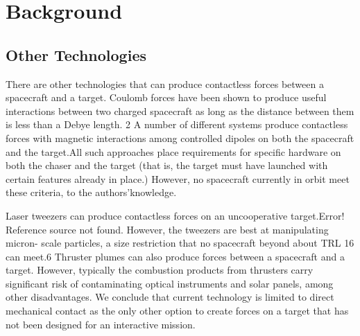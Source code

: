 \section{Background}
\subsection{Other Technologies}

There are other technologies that can produce
contactless forces between a spacecraft and a target.
Coulomb forces have been shown to produce useful
interactions between two charged spacecraft as long as
the distance between them is less than a Debye length. ‎2
A number of different systems produce contactless
forces with magnetic interactions among controlled
dipoles on both the spacecraft and the target.All such approaches place requirements for specific hardware on both the chaser and the target (that is, the target must have launched with certain features already in place.) However, no spacecraft currently in orbit meet these criteria, to the
authors’‎knowledge.

Laser tweezers can produce contactless forces on an
uncooperative target.Error! Reference source not found.
However, the tweezers are best at manipulating micron- scale particles, a size restriction that no spacecraft beyond about TRL 1‎6 can meet.6‎ Thruster plumes can also produce forces between a spacecraft and a target. However, typically the combustion products from thrusters carry significant risk of contaminating optical instruments and solar panels, among other disadvantages. We conclude that current technology is limited to direct mechanical contact as the only other option to create forces on a target that has not been designed for an interactive mission.
